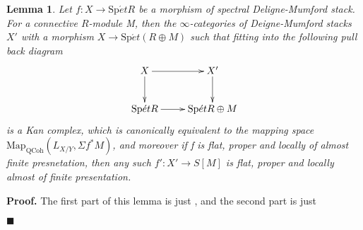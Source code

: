 \documentclass[12pt]{article}
\newtheorem{lemma}[theorem]{Lemma}
\theoremstyle{thry}
\renewenvironment{proof}
{\par \noindent \textbf{Proof.}}
{ \par \hfill $\blacksquare$ \quad \par }
\def  \Map      {\mathrm{Map}}
\def  \QCoh     {\mathrm{QCoh}}
\def  \Spet     {\mathrm{Sp}\acute{e}t}
\begin{document}
\begin{lemma}
	Let $f:X \to \Spet R$ be a morphism of spectral Deligne-Mumford stack.  For a connective $R$-module M, then  the  $\infty$-categories of  Deigne-Mumford stacks  $X'$  with  a morphism $X \to  \Spet (R \oplus M)$ such that  fitting into the following pull back diagram 
	$$
	\xymatrix{
	X \ar[r] \ar[d]  &  X'  \ar[d]  \\
	\Spet R   \ar[r]    &  \Spet R \oplus M
	}
	$$
	is  a Kan complex,  which is canonically equivalent to the mapping space $\Map_{\QCoh}(L_{X/Y}, \Sigma f^* M)$,  and moreover if f is flat, proper and locally of almost finite presnetation, then any such $f': X' \to S[M]$ is flat, proper and locally almost of finite presentation.
\end{lemma}

\begin{proof}
	The first part of this lemma is just \cite[Proposition 19.4.3.1]{lu-SAG}, and the second part is just \cite[Corollary 19.4.3.3]{lu-SAG}
\end{proof}
\end{document}
